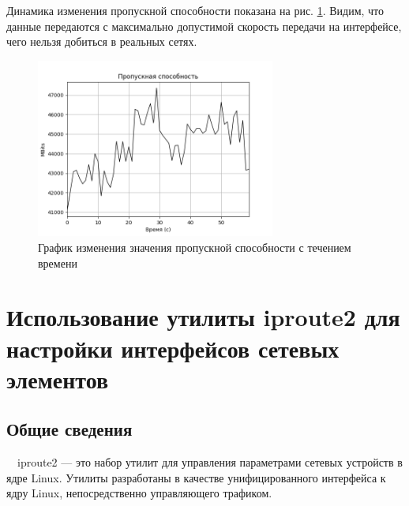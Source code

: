 \documentclass[
  13pt,
  fontsize=13pt,
  russian,
  a4paper,
,captions=tableheading
]{scrreprt}
\begin{document}
Динамика изменения пропускной способности показана на рис.
\ref{fig:0019}. Видим, что данные передаются с максимально допустимой
скорость передачи на интерфейсе, чего нельзя добиться в реальных сетях.

\begin{figure}
\hypertarget{fig:0019}{%
\centering
\includegraphics[width=0.7\textwidth,height=\textheight]{iperf_throughput.png}
\caption{График изменения значения пропускной способности с течением
времени}\label{fig:0019}
}
\end{figure}

\hypertarget{ux438ux441ux43fux43eux43bux44cux437ux43eux432ux430ux43dux438ux435-ux443ux442ux438ux43bux438ux442ux44b-iproute2-ux434ux43bux44f-ux43dux430ux441ux442ux440ux43eux439ux43aux438-ux438ux43dux442ux435ux440ux444ux435ux439ux441ux43eux432-ux441ux435ux442ux435ux432ux44bux445-ux44dux43bux435ux43cux435ux43dux442ux43eux432}{%
\chapter{Использование утилиты iproute2 для настройки интерфейсов
сетевых
элементов}\label{ux438ux441ux43fux43eux43bux44cux437ux43eux432ux430ux43dux438ux435-ux443ux442ux438ux43bux438ux442ux44b-iproute2-ux434ux43bux44f-ux43dux430ux441ux442ux440ux43eux439ux43aux438-ux438ux43dux442ux435ux440ux444ux435ux439ux441ux43eux432-ux441ux435ux442ux435ux432ux44bux445-ux44dux43bux435ux43cux435ux43dux442ux43eux432}}

\hypertarget{ux43eux431ux449ux438ux435-ux441ux432ux435ux434ux435ux43dux438ux44f}{%
\section{Общие
сведения}\label{ux43eux431ux449ux438ux435-ux441ux432ux435ux434ux435ux43dux438ux44f}}

\(\quad\)iproute2 --- это набор утилит для управления параметрами
сетевых устройств в ядре Linux. Утилиты разработаны в качестве
унифицированного интерфейса к ядру Linux, непосредственно управляющего
трафиком.
\end{document}
